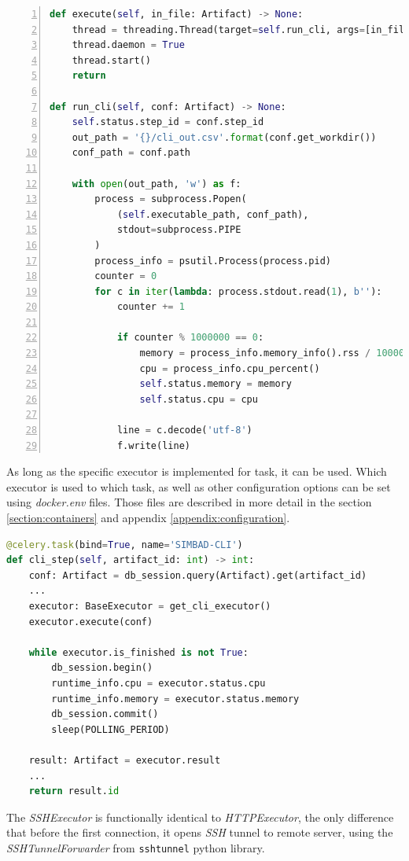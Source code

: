 \begin{lstlisting}[label=list:sp-exec-local,caption=Fragment of \textit{LocalExecutor} for \textit{SimBaD-CLI}, basicstyle=\footnotesize\ttfamily, language=python, numbers=left]
def execute(self, in_file: Artifact) -> None:
    thread = threading.Thread(target=self.run_cli, args=[in_file])
    thread.daemon = True
    thread.start()
    return
    
def run_cli(self, conf: Artifact) -> None:
    self.status.step_id = conf.step_id
    out_path = '{}/cli_out.csv'.format(conf.get_workdir())
    conf_path = conf.path

    with open(out_path, 'w') as f:
        process = subprocess.Popen(
            (self.executable_path, conf_path), 
            stdout=subprocess.PIPE
        )
        process_info = psutil.Process(process.pid)
        counter = 0
        for c in iter(lambda: process.stdout.read(1), b''):
            counter += 1

            if counter % 1000000 == 0:
                memory = process_info.memory_info().rss / 1000000
                cpu = process_info.cpu_percent()
                self.status.memory = memory
                self.status.cpu = cpu

            line = c.decode('utf-8')
            f.write(line)
\end{lstlisting}
As long as the specific executor is implemented for task, it can be used. Which executor is used to which task, as well as other configuration options can be set using \textit{docker.env} files. Those files are described in more detail in the section \ref{section:containers} and appendix \ref{appendix:configuration}.
\begin{lstlisting}[label=list:sp-exec-local-use,caption=Use of LocalExecutor for SimBaD-CLI step, basicstyle=\footnotesize\ttfamily, language=python]
@celery.task(bind=True, name='SIMBAD-CLI')
def cli_step(self, artifact_id: int) -> int:
    conf: Artifact = db_session.query(Artifact).get(artifact_id)
    ...
    executor: BaseExecutor = get_cli_executor()
    executor.execute(conf)

    while executor.is_finished is not True:
        db_session.begin()
        runtime_info.cpu = executor.status.cpu
        runtime_info.memory = executor.status.memory
        db_session.commit()
        sleep(POLLING_PERIOD)

    result: Artifact = executor.result
    ...
    return result.id
\end{lstlisting}
The \textit{SSHExecutor} is functionally identical to \textit{HTTPExecutor}, the only difference that before the first connection, it opens \textit{SSH} tunnel to remote server, using the \textit{SSHTunnelForwarder} from \texttt{sshtunnel} python library. \cite{SSHtunnel} 

